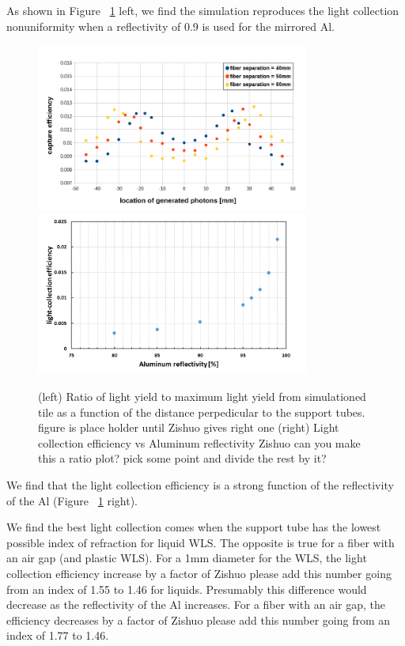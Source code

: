 \documentclass[review]{elsarticle}
\begin{document}
As shown in Figure ~\ref{fig:simeff} left, we find the simulation reproduces the light collection nonuniformity when a reflectivity of 0.9 is used for the mirrored Al.

\begin{figure}[!ht]
\begin{center}
\includegraphics[width=0.8\textwidth]{./figures/geant_result_uniformity.png}
\includegraphics[width=0.8\textwidth]{./figures/geant_result_reflectivity.png}
\caption{(left)
Ratio of light yield to maximum light yield from simulationed tile as a function of the distance perpedicular to the support tubes. {\color{red} figure is place holder until Zishuo gives right one}
(right) Light collection efficiency vs Aluminum reflectivity {\color{red} Zishuo can you make this a ratio plot?  pick some point and divide the rest by it?}
}
\label{fig:simeff}
\end{center}
\end{figure}


We find that the light collection efficiency is a strong function of the reflectivity of the Al (Figure ~\ref{fig:simeff} right).


We find the best light collection comes when the support tube has the
lowest possible index of refraction for liquid WLS.  The opposite is true for a fiber with an air gap (and plastic WLS).  For a 1mm diameter for the WLS,
the light collection efficiency increase by a factor of {\color{red} Zishuo please add this number} going from an index of
1.55 to 1.46 for liquids.  Presumably this difference would decrease as the reflectivity of the Al increases. For a fiber with an air gap, the efficiency 
decreases by a factor of {\color{red} Zishuo please add this number} going from
an index of 1.77 to 1.46.
\end{document}
